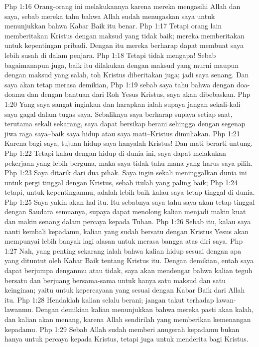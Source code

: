 Php 1:16  Orang-orang ini melakukannya karena mereka mengasihi Allah dan saya, sebab mereka tahu bahwa Allah sudah menugaskan saya untuk menunjukkan bahwa Kabar Baik itu benar.
Php 1:17  Tetapi orang lain memberitakan Kristus dengan maksud yang tidak baik; mereka memberitakan untuk kepentingan pribadi. Dengan itu mereka berharap dapat membuat saya lebih susah di dalam penjara.
Php 1:18  Tetapi tidak mengapa! Sebab bagaimanapun juga, baik itu dilakukan dengan maksud yang murni maupun dengan maksud yang salah, toh Kristus diberitakan juga; jadi saya senang. Dan saya akan tetap merasa demikian,
Php 1:19  sebab saya tahu bahwa dengan doa-doamu dan dengan bantuan dari Roh Yesus Kristus, saya akan dibebaskan.
Php 1:20  Yang saya sangat inginkan dan harapkan ialah supaya jangan sekali-kali saya gagal dalam tugas saya. Sebaliknya saya berharap supaya setiap saat, terutama sekali sekarang, saya dapat bersikap berani sehingga dengan segenap jiwa raga saya--baik saya hidup atau saya mati--Kristus dimuliakan.
Php 1:21  Karena bagi saya, tujuan hidup saya hanyalah Kristus! Dan mati berarti untung.
Php 1:22  Tetapi kalau dengan hidup di dunia ini, saya dapat melakukan pekerjaan yang lebih berguna, maka saya tidak tahu mana yang harus saya pilih.
Php 1:23  Saya ditarik dari dua pihak. Saya ingin sekali meninggalkan dunia ini untuk pergi tinggal dengan Kristus, sebab itulah yang paling baik;
Php 1:24  tetapi, untuk kepentinganmu, adalah lebih baik kalau saya tetap tinggal di dunia.
Php 1:25  Saya yakin akan hal itu. Itu sebabnya saya tahu saya akan tetap tinggal dengan Saudara semuanya, supaya dapat menolong kalian menjadi makin kuat dan makin senang dalam percaya kepada Tuhan.
Php 1:26  Sebab itu, kalau saya nanti kembali kepadamu, kalian yang sudah bersatu dengan Kristus Yesus akan mempunyai lebih banyak lagi alasan untuk merasa bangga atas diri saya.
Php 1:27  Nah, yang penting sekarang ialah bahwa kalian hidup sesuai dengan apa yang dituntut oleh Kabar Baik tentang Kristus itu. Dengan demikian, entah saya dapat berjumpa denganmu atau tidak, saya akan mendengar bahwa kalian teguh bersatu dan berjuang bersama-sama untuk hanya satu maksud dan satu keinginan; yaitu untuk kepercayaan yang sesuai dengan Kabar Baik dari Allah itu.
Php 1:28  Hendaklah kalian selalu berani; jangan takut terhadap lawan-lawanmu. Dengan demikian kalian menunjukkan bahwa mereka pasti akan kalah, dan kalian akan menang, karena Allah sendirilah yang memberikan kemenangan kepadamu.
Php 1:29  Sebab Allah sudah memberi anugerah kepadamu bukan hanya untuk percaya kepada Kristus, tetapi juga untuk menderita bagi Kristus.
